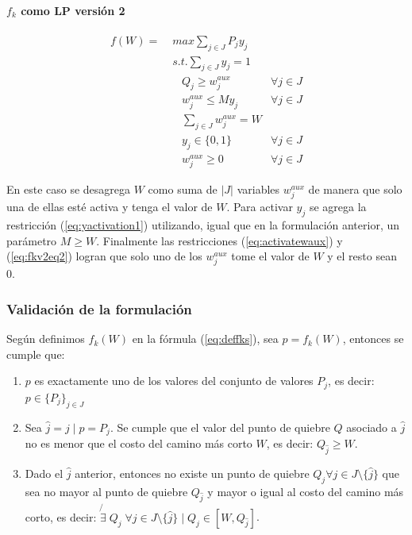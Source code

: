 \documentclass{article}
\begin{document}
  \paragraph*{$f_k$ como LP versión 2}

  \begin{align}
    f(W) =\; & max \sum_{j \in J} P_j y_j             & \label{eq:fkv2eq1}\\
             & s.t. \sum_{j \in J} y_j = 1            & \label{eq:fkv2eq2}\\
             & \;\;\; Q_j \geq w^{aux}_j              & \forall j \in J \label{eq:implfkoriginalineq} \\
             & \;\;\; w^{aux}_j \leq M y_j            & \forall j \in J \label{eq:yactivation1} \\
             & \;\;\; \sum_{j \in J} w^{aux}_j = W    & \label{eq:activatewaux} \\
             & \;\;\; y_j \in \{0,1\}                 & \label{eq:fkv2domainy} \forall j \in J\\
             & \;\;\; w^{aux}_j \geq 0                & \label{eq:fkv2eq6} \forall j \in J
  \end{align}

  En este caso se desagrega $W$ como suma de $|J|$ variables $w^{aux}_j$ de manera que solo una de ellas esté activa y tenga el valor de $W$. Para activar $y_j$ se agrega la restricción (\ref{eq:yactivation1}) utilizando, igual que en la formulación anterior, un parámetro $M \geq W$. Finalmente las restricciones (\ref{eq:activatewaux}) y (\ref{eq:fkv2eq2}) logran que solo uno de los $w^{aux}_j$ tome el valor de $W$ y el resto sean 0.

  \subsubsection{Validación de la formulación}

  Según definimos $f_k(W)$ en la fórmula (\ref{eq:deffks}), sea $p = f_k(W)$, entonces se cumple que:

  \begin{enumerate}
    \item {\label{deffpt1} $p$ es exactamente uno de los valores del conjunto de valores $P_j$, es decir: $p \in \{P_j\}_{j \in J}$}
    \item {\label{deffpt2} Sea $\hat{j} = j \;|\; p = P_j$. Se cumple que el valor del punto de quiebre $Q$ asociado a $\hat{j}$ no es menor que el costo del camino más corto $W$, es decir: $Q_{\hat{j}} \geq W$.}
    \item {\label{deffpt3} Dado el $\hat{j}$ anterior, entonces no existe un punto de quiebre $Q_j \forall j \in J\setminus\{\hat{j}\}$ que sea no mayor al punto de quiebre $Q_{\hat{j}}$ y mayor o igual al costo del camino más corto, es decir: $\not{\exists}\; Q_j\; \forall j \in J\setminus\{\hat{j}\} \;|\; Q_j \in  [W, Q_{\hat{j}}]$}.
  \end{enumerate}
\end{document}
